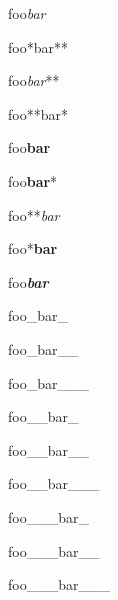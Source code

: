 foo\emph{bar}

foo*bar**

foo\emph{bar}**

foo**bar*

foo\textbf{bar}

foo\textbf{bar}*

foo**\emph{bar}

foo*\textbf{bar}

foo\textbf{\emph{bar}}

foo\_bar\_

foo\_bar\_\_

foo\_bar\_\_\_

foo\_\_bar\_

foo\_\_bar\_\_

foo\_\_bar\_\_\_

foo\_\_\_bar\_

foo\_\_\_bar\_\_

foo\_\_\_bar\_\_\_


